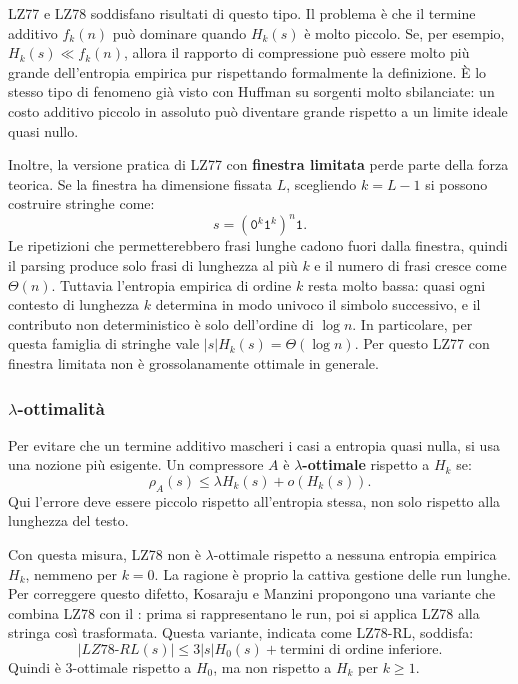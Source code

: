 \documentclass{article}
\theoremstyle{definition}
\numberwithin{equation}{section}
\begin{document}
LZ77 e LZ78 soddisfano risultati di questo tipo. Il problema è che il termine additivo $f_k(n)$ può dominare quando $H_k(s)$ è molto piccolo. Se, per esempio, $H_k(s)\ll f_k(n)$, allora il rapporto di compressione può essere molto più grande dell'entropia empirica pur rispettando formalmente la definizione. È lo stesso tipo di fenomeno già visto con Huffman su sorgenti molto sbilanciate: un costo additivo piccolo in assoluto può diventare grande rispetto a un limite ideale quasi nullo.

Inoltre, la versione pratica di LZ77 con \textbf{finestra limitata} perde parte della forza teorica. Se la finestra ha dimensione fissata $L$, scegliendo $k=L-1$ si possono costruire stringhe come:
\[
    s=(\texttt{0}^{k}\texttt{1}^{k})^n\texttt{1}.
\]
Le ripetizioni che permetterebbero frasi lunghe cadono fuori dalla finestra, quindi il parsing produce solo frasi di lunghezza al più $k$ e il numero di frasi cresce come $\Theta(n)$. Tuttavia l'entropia empirica di ordine $k$ resta molto bassa: quasi ogni contesto di lunghezza $k$ determina in modo univoco il simbolo successivo, e il contributo non deterministico è solo dell'ordine di $\log n$. In particolare, per questa famiglia di stringhe vale $|s|H_k(s)=\Theta(\log n)$. Per questo LZ77 con finestra limitata non è grossolanamente ottimale in generale.

\subsubsection{\texorpdfstring{$\lambda$-ottimalità}{lambda-ottimalità}}
Per evitare che un termine additivo mascheri i casi a entropia quasi nulla, si usa una nozione più esigente. Un compressore $A$ è \textbf{$\lambda$-ottimale} rispetto a $H_k$ se:
\begin{equation}\label{eq:lz_lambda_optimality}
    \rho_A(s)
    \leq
    \lambda H_k(s)+o(H_k(s)).
\end{equation}
Qui l'errore deve essere piccolo rispetto all'entropia stessa, non solo rispetto alla lunghezza del testo.

Con questa misura, LZ78 non è $\lambda$-ottimale rispetto a nessuna entropia empirica $H_k$, nemmeno per $k=0$. La ragione è proprio la cattiva gestione delle run lunghe. Per correggere questo difetto, Kosaraju e Manzini propongono una variante che combina LZ78 con il : prima si rappresentano le run, poi si applica LZ78 alla stringa così trasformata. Questa variante, indicata come LZ78-RL, soddisfa:
\begin{equation}\label{eq:lz78_rl_bound}
    |LZ78\text{-}RL(s)|
    \leq
    3|s|H_0(s)
    +
    \text{termini di ordine inferiore}.
\end{equation}
Quindi è $3$-ottimale rispetto a $H_0$, ma non rispetto a $H_k$ per $k\geq 1$.
\end{document}
